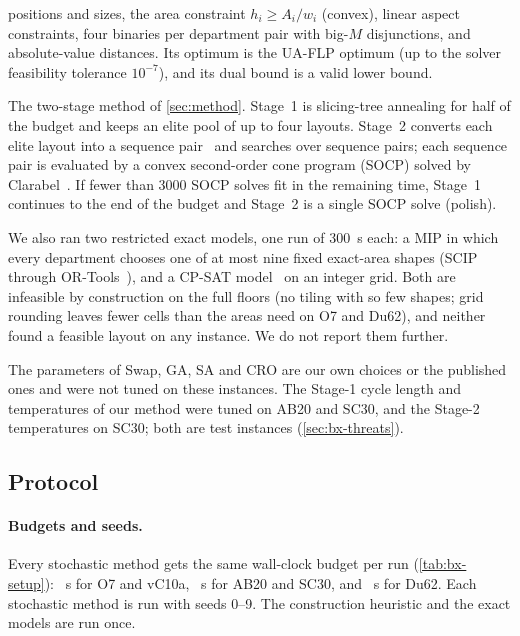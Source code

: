 \begin{description}[leftmargin=0pt]
positions and sizes, the area constraint $h_i\ge A_i/w_i$ (convex), linear aspect constraints, four binaries per
department pair with big-$M$ disjunctions, and absolute-value distances. Its optimum is the UA-FLP optimum (up to
the solver feasibility tolerance $10^{-7}$), and its dual bound is a valid lower bound.
\item[Ours.] The two-stage method of \cref{sec:method}. Stage~1 is slicing-tree annealing for half of the
budget and keeps an elite pool of up to four layouts. Stage~2 converts each elite layout into a sequence
pair~\cite{murata1996,liu2007} and searches over sequence pairs; each sequence pair is evaluated by a convex
second-order cone program (SOCP) solved by Clarabel~\cite{goulart2024}. If fewer than 3000 SOCP solves fit in the
remaining time, Stage~1 continues to the end of the budget and Stage~2 is a single SOCP solve (polish).
\end{description}

We also ran two restricted exact models, one run of 300~s each: a MIP in which every department chooses one of at
most nine fixed exact-area shapes (SCIP through OR-Tools~\cite{ortools}), and a CP-SAT model~\cite{cpsat} on an
integer grid. Both are infeasible by construction on the full floors (no tiling with so few shapes; grid rounding
leaves fewer cells than the areas need on O7 and Du62), and neither found a feasible layout on any instance. We do
not report them further.

The parameters of Swap, GA, SA and CRO are our own choices or the published ones and were not tuned on these
instances. The Stage-1 cycle length and temperatures of our method were tuned on AB20 and SC30, and the Stage-2
temperatures on SC30; both are test instances (\cref{sec:bx-threats}).

\subsection{Protocol}
\label{sec:bx-protocol}

\paragraph{Budgets and seeds.} Every stochastic method gets the same wall-clock budget per run
(\cref{tab:bx-setup}): \bxBudgetOseven~s for O7 and vC10a, \bxBudgetABtwenty~s for AB20 and SC30, and
\bxBudgetDusixtytwo~s for Du62. Each stochastic method is run with seeds 0--9. The construction heuristic and
the exact models are run once.

